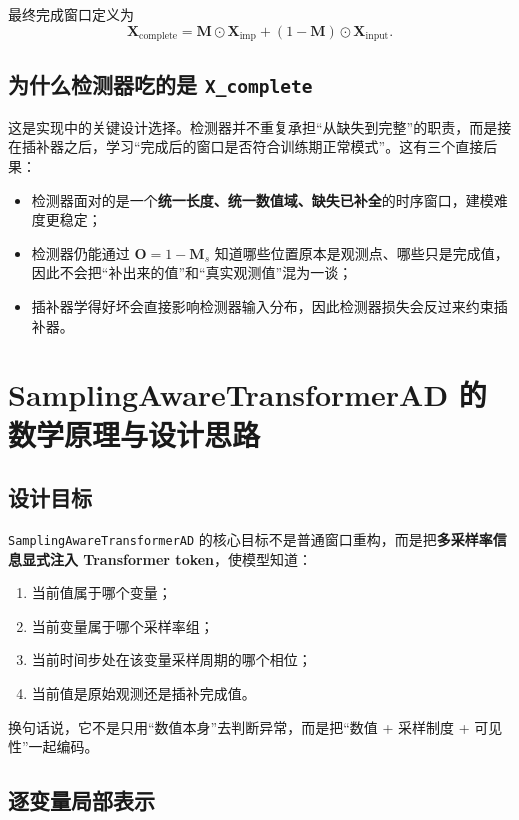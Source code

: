 \documentclass[UTF8]{ctexart}
\begin{document}
最终完成窗口定义为
\begin{equation}
    \bm{X}_{\text{complete}}
    =
    \bm{M}\odot \bm{X}_{\text{imp}}
    +
    (1-\bm{M})\odot \bm{X}_{\text{input}}.
\end{equation}

\subsection{为什么检测器吃的是 \texttt{X\_complete}}

这是实现中的关键设计选择。检测器并不重复承担“从缺失到完整”的职责，而是接在插补器之后，学习“完成后的窗口是否符合训练期正常模式”。这有三个直接后果：
\begin{itemize}
    \item 检测器面对的是一个\textbf{统一长度、统一数值域、缺失已补全}的时序窗口，建模难度更稳定；
    \item 检测器仍能通过 \(\bm{O}=1-\bm{M}_s\) 知道哪些位置原本是观测点、哪些只是完成值，因此不会把“补出来的值”和“真实观测值”混为一谈；
    \item 插补器学得好坏会直接影响检测器输入分布，因此检测器损失会反过来约束插补器。
\end{itemize}

\section{SamplingAwareTransformerAD 的数学原理与设计思路}

\subsection{设计目标}

\texttt{SamplingAwareTransformerAD} 的核心目标不是普通窗口重构，而是把\textbf{多采样率信息显式注入 Transformer token}，使模型知道：
\begin{enumerate}
    \item 当前值属于哪个变量；
    \item 当前变量属于哪个采样率组；
    \item 当前时间步处在该变量采样周期的哪个相位；
    \item 当前值是原始观测还是插补完成值。
\end{enumerate}

换句话说，它不是只用“数值本身”去判断异常，而是把“数值 + 采样制度 + 可见性”一起编码。

\subsection{逐变量局部表示}
\end{document}

